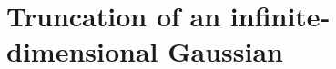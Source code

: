 \documentclass[letterpaper,11pt]{article}
\theoremstyle{plain}%
\theoremstyle{remark}
\begin{document}

\section{Truncation of an infinite-dimensional Gaussian} \label{sec:nealsexample}
\end{document}
